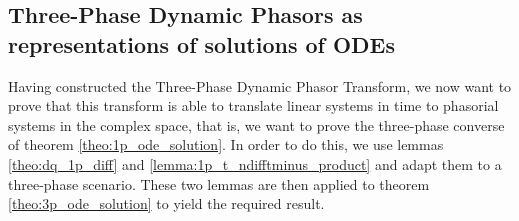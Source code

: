 \subsection{Three-Phase Dynamic Phasors as representations of solutions of ODEs} %

	Having constructed the Three-Phase Dynamic Phasor Transform, we now want to prove that this transform is able to translate linear systems in time to phasorial systems in the complex space, that is, we want to prove the three-phase converse of theorem \ref{theo:1p_ode_solution}. In order to do this, we use lemmas \ref{theo:dq_1p_diff} and \ref{lemma:1p_t_ndifftminus_product} and adapt them to a three-phase scenario. These two lemmas are then applied to theorem \ref{theo:3p_ode_solution} to yield the required result.

